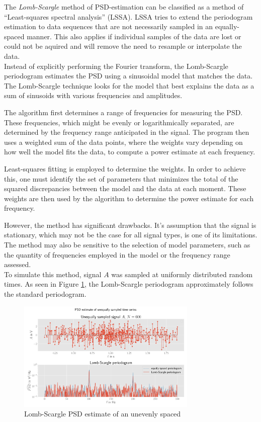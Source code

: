 The \textit{Lomb-Scargle} method of PSD-estimation can be classified as a method of ``Least-squares spectral analysis'' (LSSA). LSSA tries to extend the periodogram estimation to data sequences that are not necessarily sampled in an equally-spaced manner. This also applies if individual samples of the data are lost or could not be aquired and will remove the need to resample or interpolate the data. \cite{lomb_1}\cite{yt_video}\\

Instead of explicitly performing the Fourier transform, the Lomb-Scargle periodogram estimates the PSD using a sinusoidal model that matches the data. The Lomb-Scargle technique looks for the model that best explains the data as a sum of sinusoids with various frequencies and amplitudes.

The algorithm first determines a range of frequencies for measuring the PSD. These frequencies, which might be evenly or logarithmically separated, are determined by the frequency range anticipated in the signal. The program then uses a weighted sum of the data points, where the weights vary depending on how well the model fits the data, to compute a power estimate at each frequency.

Least-squares fitting is employed to determine the weights. In order to achieve this, one must identify the set of parameters that minimizes the total of the squared discrepancies between the model and the data at each moment. These weights are then used by the algorithm to determine the power estimate for each frequency.

However, the method has significant drawbacks. It's assumption that the signal is stationary, which may not be the case for all signal types, is one of its limitations. The method may also be sensitive to the selection of model parameters, such as the quantity of frequencies employed in the model or the frequency range assessed. \cite{saqib_1}\cite{saqib_2}\cite{saqib_3}\\

To simulate this method, signal $A$ was sampled at uniformly distributed random times. As seen in Figure \ref{fig:lomb_1}, the Lomb-Scargle periodogram approximately follows the standard periodogram.


\begin{figure}[H]
\centering
\includegraphics[width=0.764\textwidth]{graphics/lomb_scargle.pdf}
\caption{Lomb-Scargle PSD estimate of an unevenly spaced }\label{fig:lomb_1}
\end{figure}

